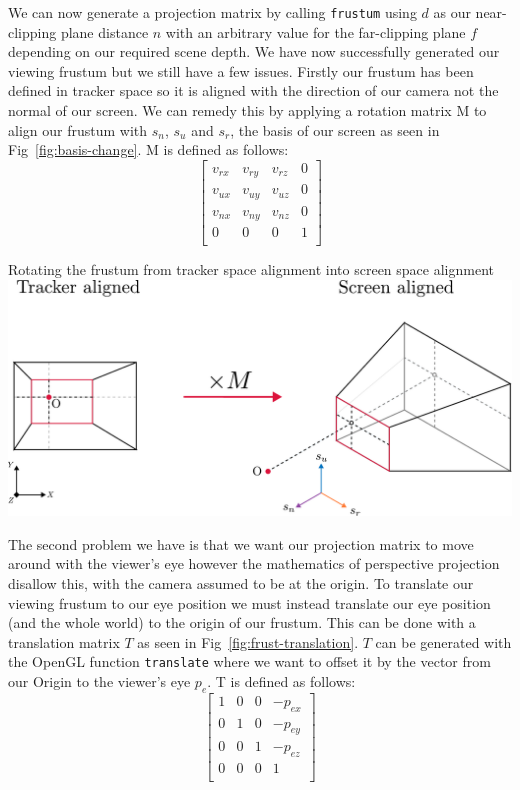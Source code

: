 We can now generate a projection matrix by calling \texttt{frustum} using $d$ as our near-clipping plane distance $n$ with an arbitrary value for the far-clipping plane $f$ depending on our required scene depth. We have now successfully generated our viewing frustum but we still have a few issues. Firstly our frustum has been defined in tracker space so it is aligned with the direction of our camera not the normal of our screen. We can remedy this by applying a rotation matrix M to align our frustum with $s_n$, $s_u$ and $s_r$, the basis of our screen as seen in Fig~\ref{fig:basis-change}. M is defined as follows:
\[
    \begin{bmatrix}
        v_{rx} & v_{ry} & v_{rz} & 0 \\
        v_{ux} & v_{uy} & v_{uz} & 0 \\
        v_{nx} & v_{ny} & v_{nz} & 0 \\
        0      & 0      & 0      & 1 \\
    \end{bmatrix}
\]

\begin{figureBox}[label={fig:basis-change}, width=0.75\linewidth]{Rotating the frustum from tracker space alignment into screen space alignment}
    \includegraphics[width = 0.8\linewidth]{./background/figures/projection/realignment.pdf}
\end{figureBox}

The second problem we have is that we want our projection matrix to move around with the viewer's eye however the mathematics of perspective projection disallow this, with the camera assumed to be at the origin. To translate our viewing frustum to our eye position we must instead translate our eye position (and the whole world) to the origin of our frustum. This can be done with a translation matrix $T$ as seen in Fig~\ref{fig:frust-translation}. $T$ can be generated with the OpenGL function \texttt{translate} where we want to offset it by the vector from our Origin to the viewer's eye $p_e$. T is defined as follows:
\[
    \begin{bmatrix}
        1 & 0 & 0 & -p_{ex} \\
        0 & 1 & 0 & -p_{ey} \\
        0 & 0 & 1 & -p_{ez} \\
        0 & 0 & 0 & 1       \\
    \end{bmatrix}
\]

